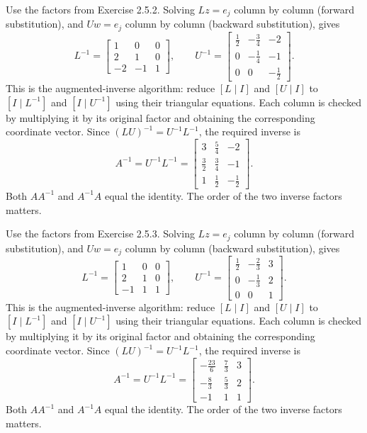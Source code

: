 Use the factors from Exercise 2.5.2. Solving $Lz=e_j$
column by column (forward substitution), and $Uw=e_j$ column by
column (backward substitution), gives
\[L^{-1}=\left[\begin{matrix}1 & 0 & 0\\2 & 1 & 0\\-2 & -1 & 1\end{matrix}\right],\qquad U^{-1}=\left[\begin{matrix}\frac{1}{2} & - \frac{3}{4} & -2\\0 & - \frac{1}{4} & -1\\0 & 0 & - \frac{1}{2}\end{matrix}\right].\]
This is the augmented-inverse algorithm: reduce $[L\mid I]$ and
$[U\mid I]$ to $[I\mid L^{-1}]$ and $[I\mid U^{-1}]$ using their
triangular equations. Each column is checked by multiplying it by its
original factor and obtaining the corresponding coordinate vector.
Since $(LU)^{-1}=U^{-1}L^{-1}$, the required inverse is
\[A^{-1}=U^{-1}L^{-1}=\left[\begin{matrix}3 & \frac{5}{4} & -2\\\frac{3}{2} & \frac{3}{4} & -1\\1 & \frac{1}{2} & - \frac{1}{2}\end{matrix}\right].\]
Both $AA^{-1}$ and $A^{-1}A$ equal the identity. The order of the
two inverse factors matters.

Use the factors from Exercise 2.5.3. Solving $Lz=e_j$
column by column (forward substitution), and $Uw=e_j$ column by
column (backward substitution), gives
\[L^{-1}=\left[\begin{matrix}1 & 0 & 0\\2 & 1 & 0\\-1 & 1 & 1\end{matrix}\right],\qquad U^{-1}=\left[\begin{matrix}\frac{1}{2} & - \frac{2}{3} & 3\\0 & - \frac{1}{3} & 2\\0 & 0 & 1\end{matrix}\right].\]
This is the augmented-inverse algorithm: reduce $[L\mid I]$ and
$[U\mid I]$ to $[I\mid L^{-1}]$ and $[I\mid U^{-1}]$ using their
triangular equations. Each column is checked by multiplying it by its
original factor and obtaining the corresponding coordinate vector.
Since $(LU)^{-1}=U^{-1}L^{-1}$, the required inverse is
\[A^{-1}=U^{-1}L^{-1}=\left[\begin{matrix}- \frac{23}{6} & \frac{7}{3} & 3\\- \frac{8}{3} & \frac{5}{3} & 2\\-1 & 1 & 1\end{matrix}\right].\]
Both $AA^{-1}$ and $A^{-1}A$ equal the identity. The order of the
two inverse factors matters.

